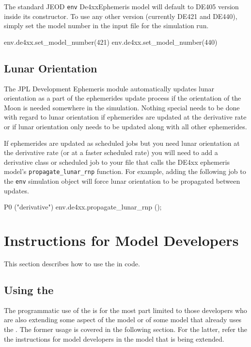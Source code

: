 The standard JEOD \verb|env| De4xxEphemeris model will default to DE405 version
inside its constructor. To use any other version (currently DE421 and DE440), 
simply set the model number in the input file for the simulation run.

\begin{codeblock}
env.de4xx.set_model_number(421)
env.de4xx.set_model_number(440)
\end{codeblock}



\subsection{Lunar Orientation}
\label{sec:guide_lunar_rnp}
The JPL Development Ephemeris module automatically updates lunar orientation
as a part of the ephemerides update process if the orientation of the Moon is
needed somewhere in the simulation. Nothing special needs to be done
with regard to lunar orientation if ephemerides are updated at the derivative
rate or if lunar orientation only needs to be updated along with all
other ephemerides.

If ephemerides are updated as scheduled jobs but you need lunar orientation at
the derivative rate (or at a faster scheduled rate) you will need to
add a derivative class or scheduled job to your \Sdefine file that calls
the DE4xx ephemeris model's \verb|propagate_lunar_rnp| function.
For example, adding the following job to the \verb|env| simulation object
will force lunar orientation to be propagated between updates.
\begin{codeblock}
   P0 ("derivative") env.de4xx.propagate_lunar_rnp ();
\end{codeblock}

\section{Instructions for Model Developers}
This section describes how to use the \ModelDesc
in \Cplusplus code.

\label{sec:guide_model_developers}
\subsection{Using the \ModelDesc}
The programmatic use of the \ModelDesc is for the most part limited
to those developers who are also extending some aspect of the model
or of some model that already uses the \ModelDesc.
The former usage is covered in the following section.
For the latter, refer the the instructions for model developers
in the model that is being extended.

